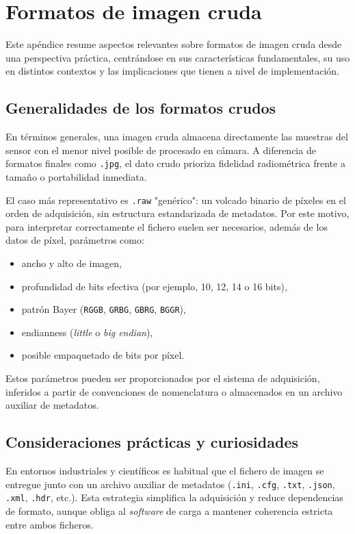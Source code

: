 \section{Formatos de imagen cruda} \label{sec:appendix_C_raw_formats}

Este apéndice resume aspectos relevantes sobre
formatos de imagen cruda desde una perspectiva práctica, centrándose en 
sus características fundamentales, su uso en distintos contextos y las
implicaciones que tienen a nivel de implementación.

\subsection{Generalidades de los formatos crudos}

En términos generales, una imagen cruda almacena directamente las muestras del sensor con el menor
nivel posible de procesado en cámara. A diferencia de formatos finales como
\texttt{.jpg}, el dato crudo prioriza fidelidad radiométrica frente a tamaño o
portabilidad inmediata.

El caso más representativo es \texttt{.raw} "genérico": un volcado binario de
píxeles en el orden de adquisición, sin estructura estandarizada de metadatos.
Por este motivo, para interpretar correctamente el fichero suelen ser necesarios,
además de los datos de píxel, parámetros como:

\begin{itemize}[noitemsep]
    \item ancho y alto de imagen,
    \item profundidad de bits efectiva (por ejemplo, 10, 12, 14 o 16 bits),
    \item patrón Bayer (\texttt{RGGB}, \texttt{GRBG}, \texttt{GBRG}, \texttt{BGGR}),
    \item endianness (\textit{little} o \textit{big endian}),
    \item posible empaquetado de bits por píxel.
\end{itemize}

Estos parámetros pueden ser proporcionados por el sistema de adquisición, inferidos a
partir de convenciones de nomenclatura o almacenados en un archivo auxiliar de
metadatos.

\subsection{Consideraciones prácticas y curiosidades}

En entornos industriales y científicos es habitual que el fichero de imagen se
entregue junto con un archivo auxiliar de metadatos (\texttt{.ini}, \texttt{.cfg},
\texttt{.txt}, \texttt{.json}, \texttt{.xml}, \texttt{.hdr}, etc.). Esta
estrategia simplifica la adquisición y reduce dependencias de formato, aunque
obliga al \textit{software} de carga a mantener coherencia estricta entre ambos
ficheros.

